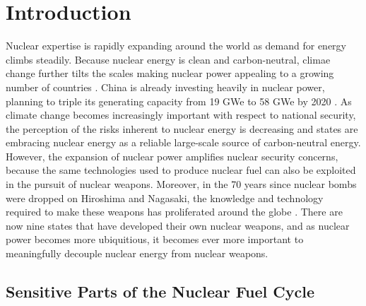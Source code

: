 \section{Introduction}
\label{s_motive}

Nuclear expertise is rapidly expanding around the world as demand for energy climbs steadily. Because nuclear energy is clean and carbon-neutral, climae change further tilts the scales making nuclear power appealing to a growing number of countries \cite{mooney_why_2014}.  China is already investing heavily in nuclear power, planning to triple its generating capacity from 19 \gls{GWe} to 58 \gls{GWe} by 2020 \cite{_china_2014}.  As climate change becomes increasingly important with respect to national security, the perception of the risks inherent to nuclear energy is decreasing and states are embracing nuclear energy as a reliable large-scale source of carbon-neutral energy.  However, the expansion of nuclear power amplifies nuclear security concerns, because the same technologies used to produce nuclear fuel can also be exploited in the pursuit of nuclear weapons.  Moreover, in the 70 years since nuclear bombs were dropped on Hiroshima and Nagasaki, the knowledge and technology required to make these weapons has proliferated around the globe \cite{feiveson_unmaking_2014}. There are now nine states that have developed their own nuclear weapons, and as nuclear power becomes more ubiquitious, it becomes ever more important to meaningfully decouple nuclear energy from nuclear weapons.  


\subsection{Sensitive Parts of the Nuclear Fuel Cycle}

